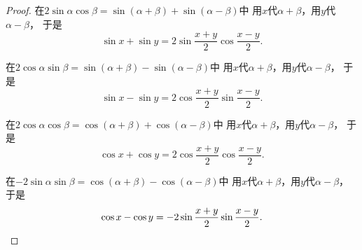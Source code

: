 \begin{theorem}[和积互化公式]
\begin{proof}
在\(2\sin\alpha\cos\beta = \sin(\alpha+\beta) + \sin(\alpha-\beta)\)中
用\(x\)代\(\alpha+\beta\)，用\(y\)代\(\alpha-\beta\)，
于是\begin{equation*}
	\sin x + \sin y = 2 \sin\frac{x+y}2 \cos\frac{x-y}2.
\end{equation*}

在\(2\cos\alpha\sin\beta = \sin(\alpha+\beta) - \sin(\alpha-\beta)\)中
用\(x\)代\(\alpha+\beta\)，用\(y\)代\(\alpha-\beta\)，
于是\begin{equation*}
	\sin x - \sin y = 2 \cos\frac{x+y}2 \sin\frac{x-y}2.
\end{equation*}

在\(2\cos\alpha\cos\beta = \cos(\alpha+\beta) + \cos(\alpha-\beta)\)中
用\(x\)代\(\alpha+\beta\)，用\(y\)代\(\alpha-\beta\)，
于是\begin{equation*}
	\cos x + \cos y = 2 \cos\frac{x+y}2 \cos\frac{x-y}2.
\end{equation*}

在\(-2\sin\alpha\sin\beta = \cos(\alpha+\beta) - \cos(\alpha-\beta)\)中
用\(x\)代\(\alpha+\beta\)，用\(y\)代\(\alpha-\beta\)，
于是\begin{equation*}
	\cos x - \cos y = -2 \sin\frac{x+y}2 \sin\frac{x-y}2.
	\qedhere
\end{equation*}
\end{proof}
\end{theorem}

